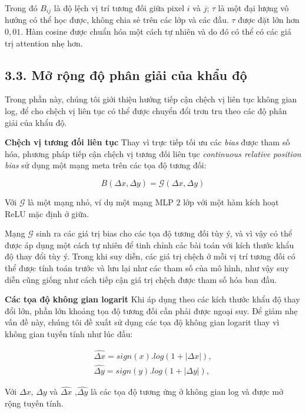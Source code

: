 \documentclass[times, twocolumn]{zHenriquesLab-StyleBioRxiv}
\begin{document}
Trong đó $B_{ij}$ là độ lệch vị trí tương đối giữa pixel $i$ và $j$; $\tau$ là một đại lượng vô hướng có thể học được, không chia sẻ trên các lớp và các đầu. $\tau$ được đặt lớn hơn $0,01$. Hàm cosine được chuẩn hóa một cách tự nhiên và do đó có thể có các giá trị attention nhẹ hơn.

\subsection*{3.3. Mở rộng độ phân giải của khẩu độ}
Trong phần này, chúng tôi giới thiệu hướng tiếp cận chệch vị liên tục không gian log, để cho chệch vị liên tục có thể được chuyển đổi trơn tru theo các độ phân giải của khẩu độ.

\vspace*{5mm}
\textbf{Chệch vị tương đối liên tục} Thay vì trực tiếp tối ưu các \textit{bias} được tham số hóa, phương pháp tiếp cận chệch vị tương đối liên tục \textit{continuous relative position bias} sử dụng một mạng meta trên các tọa độ tương đối:

$$B(\Delta{x},\Delta{y}) = \mathcal{G}(\Delta{x},\Delta{y})$$

Với $\mathcal{G}$ là một mạng nhỏ, ví dụ một mạng MLP $2$ lớp với một hàm kích hoạt ReLU mặc định ở giữa.

Mạng $\mathcal{G}$ sinh ra các giá trị bias cho các tọa độ tương đối tùy ý, và vì vậy có thể được áp dụng một cách tự nhiên để tinh chỉnh các bài toán với kích thước khẩu độ thay đổi tùy ý. Trong khi suy diễn, các giá trị chệch ở mỗi vị trí tương đối có thể được tính toán trước và lưu lại như các tham số của mô hình, như vậy suy diễn cũng giống như cách tiếp cận giá trị chệch được tham số hóa ban đầu.

\vspace*{5mm}
\textbf{Các tọa độ không gian logarit} Khi áp dụng theo các kích thước khẩu độ thay đổi lớn, phần lớn khoảng tọa độ tương đối cần phải được ngoại suy. Để giảm nhẹ vấn đề này, chúng tôi đề xuất sử dụng các tọa độ không gian logarit thay vì không gian tuyến tính như lúc đầu:

$$
    \begin{aligned}
        \widehat{\Delta{x}} = sign(x).log(1+|\Delta{x}|), \\
        \widehat{\Delta{y}} = sign(y).log(1+|\Delta{y}|),
    \end{aligned}
$$

Với $\Delta{x}$, $\Delta{y}$ và $\widehat{\Delta{x}}$ ,$\widehat{\Delta{y}}$ là các tọa độ tương ứng ở không gian log và được mở rộng tuyến tính.
\end{document}
